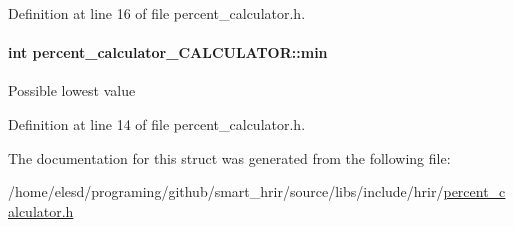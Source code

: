 Definition at line 16 of file percent\-\_\-calculator.\-h.

\hypertarget{a00006_ac08616554fb94f35aa4ef42906c79b6a}{
\paragraph[{min}]{\setlength{\rightskip}{0pt plus 5cm}int percent\-\_\-calculator\-\_\-\-C\-A\-L\-C\-U\-L\-A\-T\-O\-R\-::min}}\label{a00006_ac08616554fb94f35aa4ef42906c79b6a}
Possible lowest value 

Definition at line 14 of file percent\-\_\-calculator.\-h.



The documentation for this struct was generated from the following file\-:\begin{DoxyCompactItemize}
\item 
/home/elesd/programing/github/smart\-\_\-hrir/source/libs/include/hrir/\hyperlink{a00016}{percent\-\_\-calculator.\-h}\end{DoxyCompactItemize}
